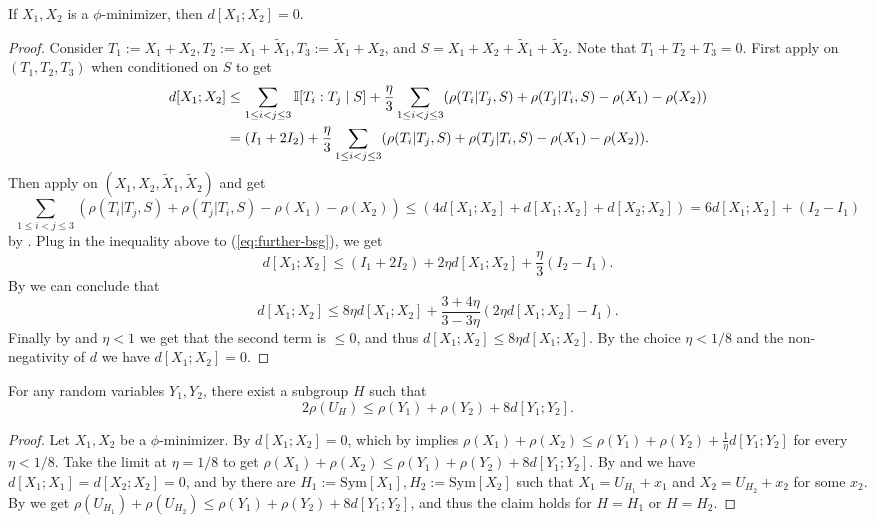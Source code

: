 \begin{proposition}\label{phi-minimizer-zero-distance}  If $X_1,X_2$ is a $\phi$-minimizer, then $d[X_1;X_2] = 0$.
\end{proposition}

\begin{proof}
Consider $T_1:=X_1+X_2,T_2:=X_1+\tilde X_1, T_3:=\tilde X_1 + X_2$, and $S=X_1+X_2+\tilde X_1 + \tilde X_2$. Note that $T_1+T_2+T_3=0$.
First apply  on $(T_1,T_2,T_3)$ when conditioned on $S$ to get
\begin{align}  \label{eq:further-bsg}
d[X_1;X_2] &\leq  \sum_{1 \leq i<j \leq 3} \mathbb{I}[T_i:T_j\mid S] + \frac{\eta}{3}   \sum_{1 \leq i<j \leq 3} (\rho(T_i|T_j,S) + \rho(T_j|T_i,S) -\rho(X_1)-\rho(X_2))\nonumber\\
&= (I_1+2I_2) + \frac{\eta}{3}   \sum_{1 \leq i<j \leq 3} (\rho(T_i|T_j,S) + \rho(T_j|T_i,S) -\rho(X_1)-\rho(X_2)).
\end{align}
Then apply  on $(X_1,X_2,\tilde X_1,\tilde X_2)$ and get 
$$\sum_{1 \leq i<j \leq 3} (\rho(T_i|T_j,S) + \rho(T_j|T_i,S) -  \rho(X_1)-\rho(X_2))\le (4d[X_1;X_2]+d[X_1;X_2]+d[X_2;X_2])= 6 d[X_1;X_2]+(I_2-I_1)$$
by . Plug in the inequality above to (\ref{eq:further-bsg}), we get 
$$d[X_1;X_2] \le (I_1+2I_2)+2\eta d[X_1;X_2]+\frac{\eta}{3}(I_2-I_1).$$
By  we can conclude that 
$$d[X_1;X_2] \le 8\eta d[X_1;X_2]+\frac{3+4\eta}{3-3\eta} (2\eta d[X_1;X_2]-I_1).$$
Finally by  and $\eta<1$ we get that the second term is $\le 0$, and thus $d[X_1;X_2] \le 8\eta d[X_1;X_2]$. By the choice $\eta<1/8$ and the non-negativity of $d$ we have $d[X_1;X_2]=0$.
\end{proof}


\begin{proposition} \label{pfr-rho} For any random variables $Y_1,Y_2$, there exist a subgroup $H$ such that
  $$ 2\rho(U_H) \leq \rho(Y_1) + \rho(Y_2) + 8 d[Y_1;Y_2].$$
\end{proposition}
\begin{proof}
Let $X_1,X_2$ be a $\phi$-minimizer. By  $d[X_1;X_2]=0$, which by  implies $\rho(X_1)+\rho(X_2)\le \rho(Y_1) + \rho(Y_2) + \frac{1}{\eta} d[Y_1;Y_2]$ for every $\eta<1/8$. Take the limit at $\eta=1/8$ to get $\rho(X_1)+\rho(X_2)\le \rho(Y_1) + \rho(Y_2) + 8 d[Y_1;Y_2]$.
By  and  we have $d[X_1;X_1]=d[X_2;X_2]=0$, and by  there are $H_1:=\mathrm{Sym}[X_1],H_2:=\mathrm{Sym}[X_2]$ such that $X_1=U_{H_1}+x_1$ and $X_2=U_{H_2}+x_2$ for some $x_2$. 
By  we get $\rho(U_{H_1})+\rho(U_{H_2})\le \rho(Y_1) + \rho(Y_2) + 8 d[Y_1;Y_2]$, and thus the claim holds for $H=H_1$ or $H=H_2$.
\end{proof}

